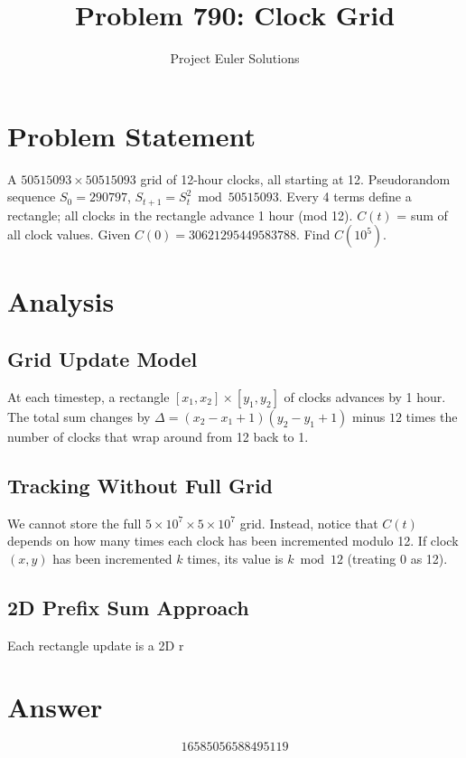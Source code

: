 \documentclass[11pt]{article}
\title{Problem 790: Clock Grid}
\author{Project Euler Solutions}
\date{}
\begin{document}
\maketitle
\section{Problem Statement}
A $50515093 \times 50515093$ grid of 12-hour clocks, all starting at 12. Pseudorandom sequence $S_0=290797$, $S_{t+1} = S_t^2 \bmod 50515093$. Every 4 terms define a rectangle; all clocks in the rectangle advance 1 hour (mod 12). $C(t)$ = sum of all clock values. Given $C(0)=30621295449583788$. Find $C(10^5)$.
\section{Analysis}
\subsection*{Grid Update Model}

At each timestep, a rectangle $[x_1, x_2] \times [y_1, y_2]$ of clocks advances by 1 hour. The total sum changes by $\Delta = (x_2-x_1+1)(y_2-y_1+1)$ minus $12$ times the number of clocks that wrap around from 12 back to 1.

\subsection*{Tracking Without Full Grid}

We cannot store the full $5 \times 10^7 \times 5 \times 10^7$ grid. Instead, notice that $C(t)$ depends on how many times each clock has been incremented modulo 12. If clock $(x,y)$ has been incremented $k$ times, its value is $k \bmod 12$ (treating 0 as 12).

\subsection*{2D Prefix Sum Approach}

Each rectangle update is a 2D r
\section{Answer}

\[
\boxed{16585056588495119}
\]
\end{document}
